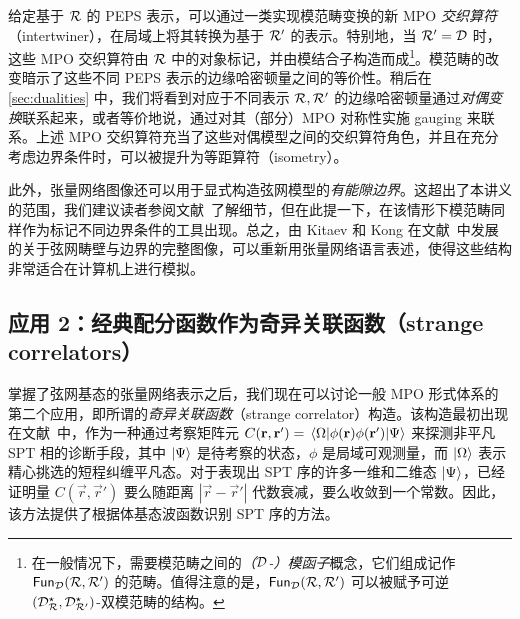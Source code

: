 给定基于 $\mathcal R$ 的 PEPS 表示，可以通过一类实现模范畴变换的新 MPO \emph{交织算符}（intertwiner），在局域上将其转换为基于 $\mathcal R'$ 的表示。特别地，当 $\mathcal R'=\mathcal D$ 时，这些 MPO 交织算符由 $\mathcal R$ 中的对象标记，并由模结合子构造而成\footnote{\label{fn}在一般情况下，需要模范畴之间的\emph{（$\mathcal D$-）模函子}概念，它们组成记作 $\mathsf{Fun}_\mathcal D(\mathcal R,\mathcal R')$ 的范畴。值得注意的是，$\mathsf{Fun}_\mathcal D(\mathcal R,\mathcal R')$ 可以被赋予可逆 $(\mathcal D_\mathcal R^\star,\mathcal D_{\mathcal R'}^\star)$-双模范畴的结构。}。模范畴的改变暗示了这些不同 PEPS 表示的边缘哈密顿量之间的等价性。稍后在 \cref{sec:dualities} 中，我们将看到对应于不同表示 $\mathcal R,\mathcal R'$ 的边缘哈密顿量通过\emph{对偶变换}联系起来，或者等价地说，通过对其（部分）MPO 对称性实施 gauging 来联系。上述 MPO 交织算符充当了这些对偶模型之间的交织算符角色，并且在充分考虑边界条件时，可以被提升为等距算符（isometry）。

此外，张量网络图像还可以用于显式构造弦网模型的\emph{有能隙边界}。这超出了本讲义的范围，我们建议读者参阅文献~\cite{Lootens2020}了解细节，但在此提一下，在该情形下模范畴同样作为标记不同边界条件的工具出现。总之，由 Kitaev 和 Kong 在文献~\cite{Kitaev2011}中发展的关于弦网畴壁与边界的完整图像，可以重新用张量网络语言表述，使得这些结构非常适合在计算机上进行模拟。

\subsection{应用 2：经典配分函数作为奇异关联函数（strange correlators）}\label{sec:SC}
掌握了弦网基态的张量网络表示之后，我们现在可以讨论一般 MPO 形式体系的第二个应用，即所谓的\emph{奇异关联函数}（strange correlator）构造。该构造最初出现在文献~\cite{You2013}中，作为一种通过考察矩阵元 $C({\bf r},{\bf r}') = \mel{\Omega}{\phi({\bf r})\phi({\bf r}')}{\Psi}$ 来探测非平凡 SPT 相的诊断手段，其中 $\ket{\Psi}$ 是待考察的状态，$\phi$ 是局域可观测量，而 $\ket{\Omega}$ 表示精心挑选的短程纠缠平凡态。对于表现出 SPT 序的许多一维和二维态 $\ket{\Psi}$，已经证明量 $C(\vec r,\vec r')$ 要么随距离 $|\vec r -\vec r'|$ 代数衰减，要么收敛到一个常数。因此，该方法提供了根据体基态波函数识别 SPT 序的方法。

